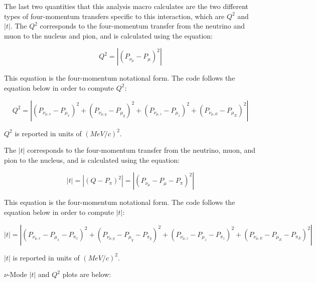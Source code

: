 \documentclass[11pt]{article}
\begin{document}
The last two quantities that this analysis macro calculates are the two different types of four-momentum transfers specific to this interaction, which are $Q^2$ and $|t|$. The $Q^2$ corresponds to the four-momentum transfer from the neutrino and muon to the nucleus and pion, and is calculated using the equation:

\begin{equation}
Q^2 = |(P_{\nu_\mu} - P_\mu)^2|
\end{equation}

\noindent
This equation is the four-momentum notational form. The code follows the equation below in order to compute $Q^2$:

\begin{equation}
Q^2 = |(P_{\nu_{\mu,x}} - P_{\mu_x})^2 + (P_{\nu_{\mu,y}} - P_{\mu_y})^2 + (P_{\nu_{\mu,z}} - P_{\mu_z})^2 + (P_{\nu_{\mu,E}} - P_{\mu_E})^2|
\end{equation}

\noindent
$Q^2$ is reported in units of $(MeV/c)^2$.

The $|t|$ corresponds to the four-momentum transfer from the neutrino, muon, and pion to the nucleus, and is calculated using the equation:

\begin{equation}
|t| = |(Q - P_\pi)^2| = |(P_{\nu_\mu} - P_\mu - P_\pi)^2|
\end{equation}

\noindent
This equation is the four-momentum notational form. The code follows the equation below in order to compute $|t|$:

\begin{equation}
|t| = |(P_{\nu_{\mu,x}} - P_{\mu_x} - P_{\pi_x})^2 + (P_{\nu_{\mu,y}} - P_{\mu_y} - P_{\pi_y})^2 + (P_{\nu_{\mu,z}} - P_{\mu_z} - P_{\pi_z})^2 + (P_{\nu_{\mu,E}} - P_{\mu_E} - P_{\pi_E})^2|
\end{equation}

\noindent
$|t|$ is reported in units of $(MeV/c)^2$.

$\nu$-Mode $|t|$ and $Q^2$ plots are below:
\end{document}
